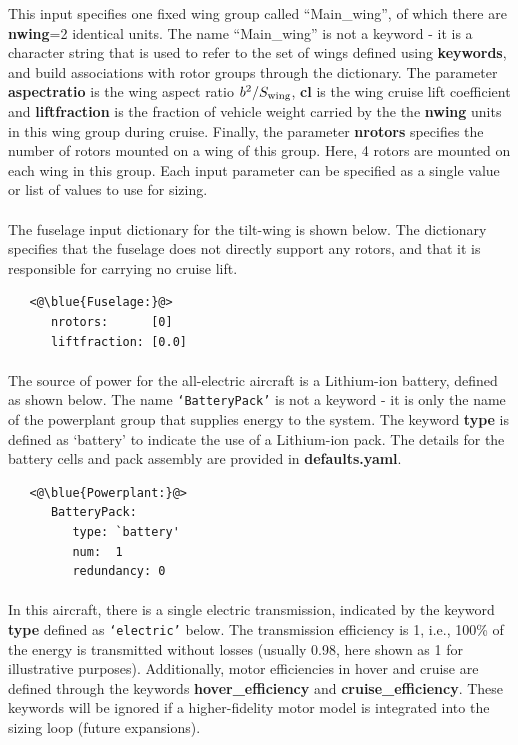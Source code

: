 This input specifies one fixed wing group called ``Main\_wing'', of which there are \textbf{nwing}=2 identical units. The name ``Main\_wing'' is not a keyword - it is a character string that is used to refer to the set of wings defined using \textbf{keywords}, and build associations with rotor groups through the  dictionary. The parameter \textbf{aspectratio} is the wing aspect ratio $b^2/S_{\rm wing}$, \textbf{cl} is the wing cruise lift coefficient and \textbf{liftfraction} is the fraction of vehicle weight carried by the the \textbf{nwing} units in this wing group during cruise. Finally, the parameter \textbf{nrotors} specifies the number of rotors mounted on a wing of this group. Here, 4 rotors are mounted on each wing in this group. Each input parameter can be specified as a single value or list of values to use for sizing.

\paragraph{}
The fuselage input dictionary for the tilt-wing is shown below. The dictionary specifies that the fuselage does not directly support any rotors, and that it is responsible for carrying no cruise lift. 
\begin{lstlisting}
   <@\blue{Fuselage:}@>
      nrotors:      [0]
      liftfraction: [0.0]
\end{lstlisting}

\paragraph{}
The source of power for the all-electric aircraft is a Lithium-ion battery, defined as shown below. The name \texttt{`BatteryPack'} is not a keyword - it is only the name of the powerplant group that supplies energy to the system. The keyword \textbf{type} is defined as `battery' to indicate the use of a Lithium-ion pack. The details for the battery cells and pack assembly are provided in \textbf{defaults.yaml}.

\begin{lstlisting}
   <@\blue{Powerplant:}@>
      BatteryPack: 
         type: `battery'
         num:  1
         redundancy: 0        
\end{lstlisting}

\paragraph{}
In this aircraft, there is a single electric transmission, indicated by the keyword \textbf{type} defined as \texttt{`electric'} below. The transmission efficiency is 1, i.e., 100\% of the energy is transmitted without losses (usually 0.98, here shown as 1 for illustrative purposes). Additionally, motor efficiencies in hover and cruise are defined through the keywords \textbf{hover\_efficiency} and \textbf{cruise\_efficiency}. These keywords will be ignored if a higher-fidelity motor model is integrated into the sizing loop (future expansions).

